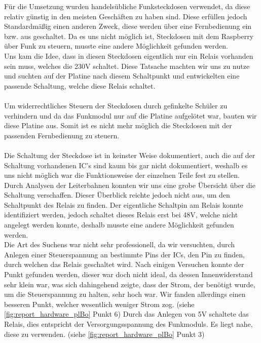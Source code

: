 Für die Umsetzung wurden handelsübliche Funksteckdosen verwendet, da diese relativ günstig in den meisten Geschäften zu haben sind. Diese erfüllen jedoch Standardmäßig einen anderen Zweck, diese werden über eine Fernbedienung ein bzw. aus geschaltet. Da es uns nicht möglich ist, Steckdosen mit dem Raspberry über Funk zu steuern, musste eine andere Möglichkeit gefunden werden.\\
Uns kam die Idee, dass in diesen Steckdosen eigentlich nur ein Relais vorhanden sein muss, welches die 230V schaltet. Diese Tatsache machten wir uns zu nutze und suchten auf der Platine nach diesem Schaltpunkt und entwickelten eine passende Schaltung, welche diese Relais schaltet.\\\\
Um widerrechtliches Steuern der Steckdosen durch gefinkelte Schüler zu verhindern und da das Funkmodul nur auf die Platine aufgelötet war, bauten wir diese Platine aus. Somit ist es nicht mehr möglich die Steckdosen mit der passenden Fernbedienung zu steuern.\\\\
Die Schaltung der Steckdose ist in keinster Weise dokumentiert, auch die auf der Schaltung vorhandenen IC's sind kaum bis gar nicht dokumentiert, weshalb es uns nicht möglich war die Funktionsweise der einzelnen Teile fest zu stellen. Durch Analysen der Leiterbahnen konnten wir uns eine grobe Übersicht über die Schaltung verschaffen. Dieser Überblick reichte jedoch nicht aus, um den Schaltpunkt des Relais zu finden. Der eigentliche Schaltpin am Relais konnte identifiziert werden, jedoch schaltet dieses Relais erst bei 48V, welche nicht angelegt werden konnte, deshalb musste eine andere Möglichkeit gefunden werden.\\
Die Art des Suchens war nicht sehr professionell, da wir versuchten, durch Anlegen einer Steuerspannung an bestimmte Pins der ICs, den Pin zu finden, durch welchen das Relais geschaltet wird. Nach einigen Versuchen konnte der Punkt gefunden werden, dieser war doch nicht ideal, da dessen Innenwiderstand sehr klein war, was sich dahingehend zeigte, dass der Strom, der benötigt wurde, um die Steuerspannung zu halten, sehr hoch war. Wir fanden allerdings einen besseren Punkt, welcher wesentlich weniger Strom zog. (siehe \autoref{fig:report_hardware_plBo} Punkt 6) Durch das Anlegen von 5V schaltete das Relais, dies entspricht der Versorgungsspannung des Funkmoduls. Es liegt nahe, diese zu verwenden. (siehe \autoref{fig:report_hardware_plBo} Punkt 3)\\\\
